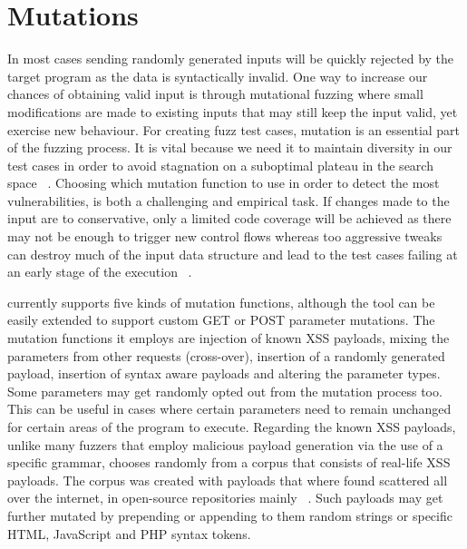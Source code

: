 \section{Mutations}
In most cases sending randomly generated inputs will be quickly rejected by the target program as the data is syntactically invalid. One way to increase our chances of obtaining valid input is through mutational fuzzing where small modifications are made to existing inputs that may still keep the input valid, yet exercise new behaviour. For creating fuzz test cases, mutation is an essential part of the fuzzing process. It is vital because we need it to maintain diversity in our test cases in order to avoid stagnation on a suboptimal plateau in the search space ~\cite{seal2016Genetic}. Choosing which mutation function to use in order to detect the most vulnerabilities, is both a challenging and empirical task. If changes made to the input are to conservative, only a limited code coverage will be achieved as there may not be enough to trigger new control flows whereas too aggressive tweaks can destroy much of the input data structure and lead to the test cases failing at an early stage of the execution ~\cite{zalewski2014Mutations}.

\pname{} currently supports five kinds of mutation functions, although the tool can be easily
extended to support custom GET or POST parameter mutations. The mutation functions it employs are injection of known XSS payloads, mixing the parameters from other requests (cross-over), insertion of a randomly generated payload, insertion of syntax aware payloads and altering the
parameter types. Some parameters may get randomly opted out from the mutation process too. This can be useful in cases where certain parameters need to remain unchanged for certain areas of the program to execute. Regarding the known XSS payloads, unlike many fuzzers that employ malicious payload generation via the use of a specific grammar, \pname{} chooses randomly from a corpus that consists of real-life XSS payloads. The corpus was created with payloads that where found scattered all over the internet, in open-source repositories mainly ~\cite{xsspayloadfirst,xsspayloadsecond}. Such payloads may get further mutated by prepending or appending to them random strings or specific HTML, JavaScript and PHP syntax tokens.

